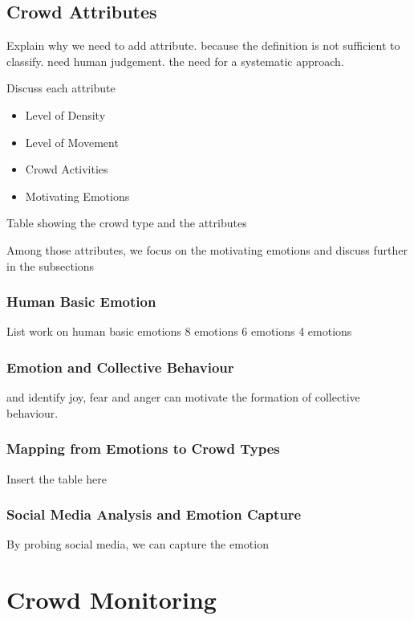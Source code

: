 \subsection{Crowd Attributes}
Explain why we need to add attribute. because the definition is not sufficient to classify. need human judgement. the need for a systematic approach.

Discuss each attribute
\begin{itemize}
	\item Level of Density
	\item Level of Movement
	\item Crowd Activities
	\item Motivating Emotions
\end{itemize}

Table showing the crowd type and the attributes

Among those attributes, we focus on the motivating emotions and discuss further in the subsections

\subsubsection{Human Basic Emotion}
List work on human basic emotions
8 emotions
6 emotions
4 emotions
\subsubsection{Emotion and Collective Behaviour}
\citet{Lofland1985} and \citet{Smelser1998} identify joy, fear and anger can motivate the formation of collective behaviour. 

\subsubsection{Mapping from Emotions to Crowd Types}
Insert the table here

\subsubsection{Social Media Analysis and Emotion Capture}
By probing social media, we can capture the emotion

\section{Crowd Monitoring}


